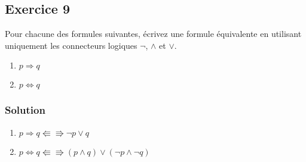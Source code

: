 % 

\subsection*{Exercice 9}
Pour chacune des formules suivantes, écrivez une formule équivalente
en utilisant uniquement les connecteurs logiques $\neg$, $\land$ et $\lor$.
\begin{enumerate}
	\item $p \Rightarrow q$
	\item $p \Leftrightarrow q$
\end{enumerate}


\subsubsection*{Solution}

    \begin{enumerate}
        \item $p \Rightarrow q \Lleftarrow \Rrightarrow \neg p \lor q$
        \item $p \Leftrightarrow q \Lleftarrow \Rrightarrow (p \land q) \lor (\neg p \land \neg q)$
    \end{enumerate}

